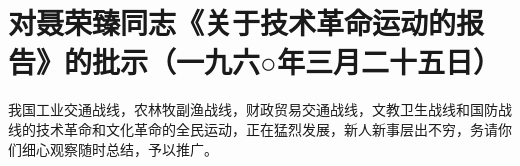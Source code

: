 \section[对聂荣臻同志《关于技术革命运动的报告》的批示（一九六○年三月二十五日）]{对聂荣臻同志《关于技术革命运动的报告》的批示（一九六○年三月二十五日）}


我国工业交通战线，农林牧副渔战线，财政贸易交通战线，文教卫生战线和国防战线的技术革命和文化革命的全民运动，正在猛烈发展，新人新事层出不穷，务请你们细心观察随时总结，予以推广。


